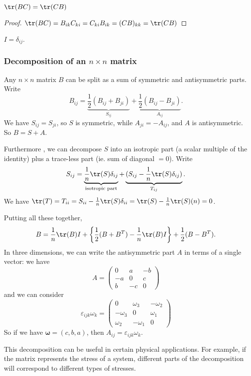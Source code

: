 \documentclass[a4paper]{article}
\begin{document}
\begin{prop}
  $\tr(BC) = \tr(CB)$
\end{prop}

\begin{proof}
  $\tr(BC) = B_{ik}C_{ki} = C_{ki}B_{ik} = (CB)_{kk} = \tr(CB)$
\end{proof}

\begin{defi}
  $I = \delta_{ij}$.
\end{defi}
\subsubsection{Decomposition of an \texorpdfstring{$n\times n$}{n x n} matrix}
Any $n\times n$ matrix $B$ can be split as a sum of symmetric and antisymmetric parts. Write
\[
  B_{ij} = \underbrace{\frac{1}{2}(B_{ij} + B_{ji})}_{S_{ij}} + \underbrace{\frac{1}{2}(B_{ij} - B_{ji})}_{A_{ij}}.
\]
We have $S_{ij} = S_{ji}$, so $S$ is symmetric, while $A_{ji} = -A_{ij}$, and $A$ is antisymmetric. So $B = S + A$.

Furthermore , we can decompose $S$ into an isotropic part (a scalar multiple of the identity) plus a trace-less part (ie. sum of diagonal $= 0$). Write
\[
  S_{ij} = \underbrace{\frac{1}{n}\tr (S)\delta_{ij}}_{\text{isotropic part}} + \underbrace{(S_{ij} - \frac{1}{n}\tr(S)\delta_{ij})}_{T_{ij}}.
\]
We have $\tr(T) = T_{ii} = S_{ii} - \frac{1}{n}\tr(S)\delta_{ii} = \tr(S) - \frac{1}{n}\tr(S)(n) = 0$.

Putting all these together,
\[
  B = \frac{1}{n}\tr(B)I + \left\{\frac{1}{2}(B + B^T) - \frac{1}{n}\tr(B)I\right\} + \frac{1}{2}(B - B^T).
\]
In three dimensions, we can write the antisymmetric part $A$ in terms of a single vector: we have
\[
  A = \begin{pmatrix}
    0 & a & -b\\
    -a & 0 & c\\
    b & -c & 0
  \end{pmatrix}
\]
and we can consider
\[
  \varepsilon_{ijk}\omega_k =
  \begin{pmatrix}
    0 & \omega_3 & -\omega_2\\
    -\omega_3 & 0 & \omega_1\\
    \omega_2 & -\omega_1 & 0
  \end{pmatrix}
\]
So if we have $\mathbf{\omega} = (c, b, a)$, then $A_{ij} = \varepsilon_{ijk}\omega_k$.

This decomposition can be useful in certain physical applications. For example, if the matrix represents the stress of a system, different parts of the decomposition will correspond to different types of stresses.
\end{document}
